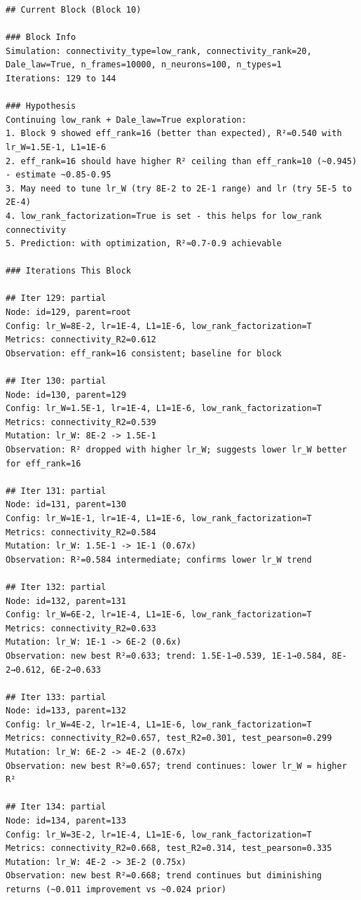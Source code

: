 \documentclass[10pt,twocolumn]{article}
\begin{document}
\begin{small}
\begin{verbatim}
## Current Block (Block 10)

### Block Info
Simulation: connectivity_type=low_rank, connectivity_rank=20, Dale_law=True, n_frames=10000, n_neurons=100, n_types=1
Iterations: 129 to 144

### Hypothesis
Continuing low_rank + Dale_law=True exploration:
1. Block 9 showed eff_rank=16 (better than expected), R²=0.540 with lr_W=1.5E-1, L1=1E-6
2. eff_rank=16 should have higher R² ceiling than eff_rank=10 (~0.945) - estimate ~0.85-0.95
3. May need to tune lr_W (try 8E-2 to 2E-1 range) and lr (try 5E-5 to 2E-4)
4. low_rank_factorization=True is set - this helps for low_rank connectivity
5. Prediction: with optimization, R²≈0.7-0.9 achievable

### Iterations This Block

## Iter 129: partial
Node: id=129, parent=root
Config: lr_W=8E-2, lr=1E-4, L1=1E-6, low_rank_factorization=T
Metrics: connectivity_R2=0.612
Observation: eff_rank=16 consistent; baseline for block

## Iter 130: partial
Node: id=130, parent=129
Config: lr_W=1.5E-1, lr=1E-4, L1=1E-6, low_rank_factorization=T
Metrics: connectivity_R2=0.539
Mutation: lr_W: 8E-2 -> 1.5E-1
Observation: R² dropped with higher lr_W; suggests lower lr_W better for eff_rank=16

## Iter 131: partial
Node: id=131, parent=130
Config: lr_W=1E-1, lr=1E-4, L1=1E-6, low_rank_factorization=T
Metrics: connectivity_R2=0.584
Mutation: lr_W: 1.5E-1 -> 1E-1 (0.67x)
Observation: R²=0.584 intermediate; confirms lower lr_W trend

## Iter 132: partial
Node: id=132, parent=131
Config: lr_W=6E-2, lr=1E-4, L1=1E-6, low_rank_factorization=T
Metrics: connectivity_R2=0.633
Mutation: lr_W: 1E-1 -> 6E-2 (0.6x)
Observation: new best R²=0.633; trend: 1.5E-1→0.539, 1E-1→0.584, 8E-2→0.612, 6E-2→0.633

## Iter 133: partial
Node: id=133, parent=132
Config: lr_W=4E-2, lr=1E-4, L1=1E-6, low_rank_factorization=T
Metrics: connectivity_R2=0.657, test_R2=0.301, test_pearson=0.299
Mutation: lr_W: 6E-2 -> 4E-2 (0.67x)
Observation: new best R²=0.657; trend continues: lower lr_W = higher R²

## Iter 134: partial
Node: id=134, parent=133
Config: lr_W=3E-2, lr=1E-4, L1=1E-6, low_rank_factorization=T
Metrics: connectivity_R2=0.668, test_R2=0.314, test_pearson=0.335
Mutation: lr_W: 4E-2 -> 3E-2 (0.75x)
Observation: new best R²=0.668; trend continues but diminishing returns (~0.011 improvement vs ~0.024 prior)


\end{verbatim}
\end{small}
\end{document}
